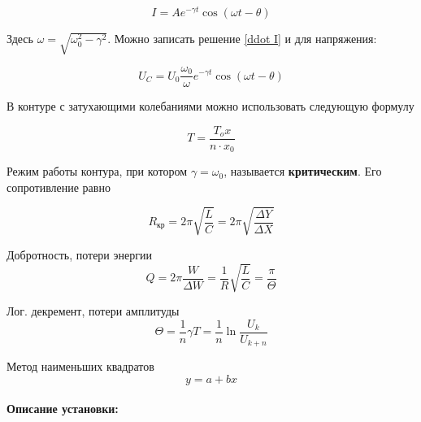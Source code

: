 \documentclass[a4paper,12pt]{article}
\begin{document}
\begin{equation}\label{}
I = A e^{-\gamma t} \cos (\omega t - \theta)
\end{equation}

Здесь $ \omega = \sqrt{\omega_0^2 - \gamma^2} $. Можно записать решение \eqref{ddot I} и для напряжения:

\begin{equation}\label{}
U_C = U_0 \dfrac{\omega_0}{\omega} e^{-\gamma t}\cos (\omega t - \theta)
\end{equation}

В контуре с затухающими колебаниями можно использовать следующую формулу

\begin{equation}\label{}
T = \frac{T_ox}{n\cdot x_0}
\end{equation}

Режим работы контура, при котором $ \gamma = \omega_0 $, называется \textbf{критическим}. Его сопротивление равно 

\begin{equation}\label{}
R_{кр} = 2\pi\sqrt{\dfrac{L}{C}} = 2\pi\sqrt{\dfrac{\Delta Y}{\Delta X}}
\end{equation}


Добротность, потери энергии
\begin{equation}\label{Q}
Q = 2\pi \dfrac{W}{\Delta W} = \dfrac{1}{R} \sqrt{\dfrac{L}{C}} = \dfrac{\pi}{\Theta}
\end{equation}

Лог. декремент, потери амплитуды
\begin{equation}\label{theta}
\Theta = \dfrac{1}{n} \gamma T = \dfrac{1}{n} \ln \dfrac{U_k}{U_{k+n}} 
\end{equation}

Метод наименьших квадратов
\begin{equation}\label{}
y = a + bx
\end{equation}

\paragraph{Описание установки:}
\end{document}
